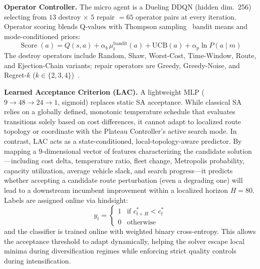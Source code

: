 \documentclass[journal]{IEEEtran}
\begin{document}
\textbf{Operator Controller.}
The micro agent is a Dueling DDQN (hidden dim.\ 256) selecting from
$13$ destroy $\times$ $5$ repair $= 65$ operator pairs at every
iteration.  Operator scoring blends Q-values with Thompson
sampling~\cite{thompson1933likelihood} bandit means and mode-conditioned
priors:
\begin{equation}
  \operatorname{Score}(a) = Q(s,a) + \alpha_b\,\mu_t^{\text{bandit}}(a)
    + \text{UCB}(a) + \alpha_p\ln P(a \mid m)
  \label{eq:score}
\end{equation}
The destroy operators include Random, Shaw, Worst-Cost, Time-Window, Route,
and Ejection-Chain variants; repair operators are Greedy, Greedy-Noise,
and Regret-$k$ ($k\!\in\!\{2,3,4\}$)~\cite{pisinger2007general}.

\textbf{Learned Acceptance Criterion (LAC).}
A lightweight MLP ($9{\to}48{\to}24{\to}1$, sigmoid) replaces static SA acceptance.
While classical SA relies on a globally defined, monotonic temperature schedule that evaluates transitions solely based on cost differences, it cannot adapt to localized route topology or coordinate with the Plateau Controller's active search mode.
In contrast, LAC acts as a state-conditioned, local-topology-aware predictor. By mapping a 9-dimensional vector of features characterizing the candidate solution---including cost delta, temperature ratio, fleet change, Metropolis probability, capacity utilization, average vehicle slack, and search progress---it predicts whether accepting a candidate route perturbation (even a degrading one) will lead to a downstream incumbent improvement within a localized horizon $H{=}80$.
Labels are assigned online via hindsight:
\begin{equation}
  y_t = \begin{cases}
    1 & \text{if } c^*_{t+H} < c^*_t \\
    0 & \text{otherwise}
  \end{cases}
  \label{eq:lac}
\end{equation}
and the classifier is trained online with weighted binary cross-entropy. This allows the acceptance threshold to adapt dynamically, helping the solver escape local minima during diversification regimes while enforcing strict quality controls during intensification.
\end{document}
